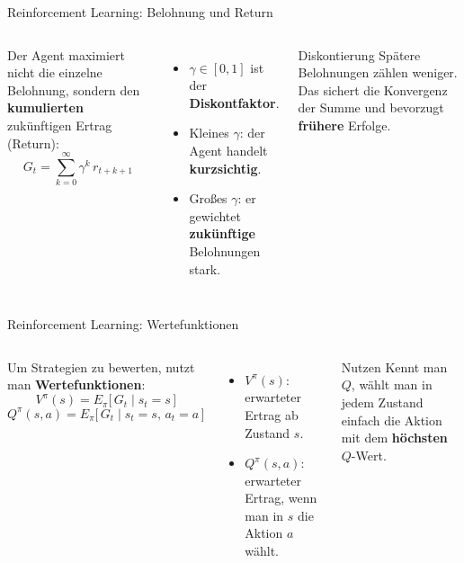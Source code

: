 \begin{frame}{Reinforcement Learning: Belohnung und Return}
\begin{columns}
Der Agent maximiert nicht die einzelne Belohnung, sondern den
\textbf{kumulierten} zukünftigen Ertrag (Return):
\[
  G_t = \sum_{k=0}^{\infty} \gamma^k \, r_{t+k+1}
\]

\begin{itemize}
  \item $\gamma \in [0,1]$ ist der \textbf{Diskontfaktor}.
  \item Kleines $\gamma$: der Agent handelt \textbf{kurzsichtig}.
  \item Großes $\gamma$: er gewichtet \textbf{zukünftige} Belohnungen stark.
\end{itemize}

\begin{blockC1}{Diskontierung}
Spätere Belohnungen zählen weniger. Das sichert die Konvergenz der Summe und
bevorzugt \textbf{frühere} Erfolge.
\end{blockC1}
\end{columns}
\end{frame}

\begin{frame}{Reinforcement Learning: Wertefunktionen}
\begin{columns}
Um Strategien zu bewerten, nutzt man \textbf{Wertefunktionen}:
\[
  V^\pi(s) = E_\pi\bigl[\, G_t \mid s_t = s \,\bigr]
\]
\[
  Q^\pi(s, a) = E_\pi\bigl[\, G_t \mid s_t = s,\, a_t = a \,\bigr]
\]

\begin{itemize}
  \item $V^\pi(s)$: erwarteter Ertrag ab Zustand $s$.
  \item $Q^\pi(s,a)$: erwarteter Ertrag, wenn man in $s$ die Aktion $a$
        wählt.
\end{itemize}

\begin{blockC1}{Nutzen}
Kennt man $Q$, wählt man in jedem Zustand einfach die Aktion mit dem
\textbf{höchsten} $Q$-Wert.
\end{blockC1}
\end{columns}
\end{frame}




